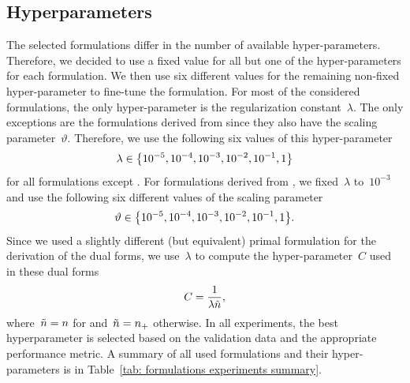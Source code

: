 \pagebreak

\subsection{Hyperparameters}

The selected formulations differ in the number of available hyper-parameters. Therefore, we decided to use a fixed value for all but one of the hyper-parameters for each formulation. We then use six different values for the remaining non-fixed hyper-parameter to fine-tune the formulation. For most of the considered formulations, the only hyper-parameter is the regularization constant~$\lambda$. The only exceptions are the formulations derived from \PatMatNP since they also have the scaling parameter~$\vartheta.$ Therefore, we use the following six values of this hyper-parameter
\begin{equation*}
  \lambda \in \Brac[c]{10^{-5}, 10^{-4}, 10^{-3}, 10^{-2}, 10^{-1}, 1}
\end{equation*}
for all formulations except \PatMatNP. For formulations derived from \PatMatNP, we fixed~$\lambda$ to~$10^{-3}$ and use the following six different values of the scaling parameter
\begin{equation*}
  \vartheta \in \Brac[c]{10^{-5}, 10^{-4}, 10^{-3}, 10^{-2}, 10^{-1}, 1}.
\end{equation*}
Since we used a slightly different (but equivalent) primal formulation for the derivation of the dual forms, we use~$\lambda$ to compute the hyper-parameter~$C$ used in these dual forms
\begin{equation*}
  C = \frac{1}{\lambda \tilde{n}},
\end{equation*}
where~$\tilde{n} = n$ for \SVM and~$\tilde{n} = n_{+}$ otherwise. In all experiments, the best hyperparameter is selected based on the validation data and the appropriate performance metric. A summary of all used formulations and their hyper-parameters is in Table~\ref{tab: formulations experiments summary}.

